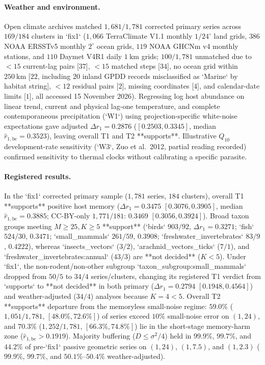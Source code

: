 \paragraph{Weather and environment.}
Open climate archives matched $1{,}681/1{,}781$ corrected primary series across $169/184$ clusters in `fix1` ($1{,}066$ TerraClimate V1.1 monthly $1/24^\circ$ land grids, $386$ NOAA ERSSTv5 monthly $2^\circ$ ocean grids, $119$ NOAA GHCNm v4 monthly stations, and $110$ Daymet V4R1 daily $1\ \mathrm{km}$ grids; $100/1{,}781$ unmatched due to $< 15$ current-lag pairs [$37$], $< 15$ matched steps [$34$], no ocean grid within $250\ \mathrm{km}$ [$22$, including $20$ inland GPDD records misclassified as `Marine` by habitat string], $< 12$ residual pairs [$2$], missing coordinates [$4$], and calendar-date limits [$1$], all accessed 15 November 2026). Regressing log host abundance on linear trend, current and physical lag-one temperature, and complete contemporaneous precipitation (`W1`) using projection-specific white-noise expectations gave adjusted $\Delta r_1 = 0.2876$ ($[0.2503, 0.3345]$, median $\hat{r}_{1,\mathrm{bc}} = 0.3523$), leaving overall T1 and T2 **supports**. Illustrative $Q_{10}$ development-rate sensitivity (`W3`, Zuo et al.\ 2012, partial reading recorded) confirmed sensitivity to thermal clocks without calibrating a specific parasite.

\paragraph{Registered results.}
In the `fix1` corrected primary sample ($1{,}781$ series, $184$ clusters), overall T1 **supports** positive host memory ($\Delta r_1 = 0.3475$ $[0.3076, 0.3905]$, median $\hat{r}_{1,\mathrm{bc}} = 0.3885$; CC-BY-only $1{,}771/181$: $0.3469$ $[0.3056, 0.3924]$). Broad taxon groups meeting $M \ge 25, K \ge 5$ **support** (`birds` $903/92$, $\Delta r_1 = 0.3271$; `fish` $524/30$, $0.3471$; `small\_mammals` $261/59$, $0.3908$; `freshwater\_invertebrates` $83/9$, $0.4222$), whereas `insects\_vectors` ($3/2$), `arachnid\_vectors\_ticks` ($7/1$), and `freshwater\_invertebrates:annual` ($43/3$) are **not decided** ($K < 5$). Under `fix1`, the non-rodent/non-other subgroup `taxon\_subgroup:small\_mammals` dropped from $50/5$ to $34/4$ series/clusters, changing its registered T1 verdict from `supports` to **not decided** in both primary ($\Delta r_1 = 0.2794$ $[0.1948, 0.4564]$) and weather-adjusted ($34/4$) analyses because $K = 4 < 5$. Overall T2 **supports** departure from the memoryless small-noise regime: $59.0\%$ ($1{,}051/1{,}781$, $[48.0\%, 72.6\%]$) of series exceed $10\%$ small-noise error on $(1, 24)$, and $70.3\%$ ($1{,}252/1{,}781$, $[66.3\%, 74.8\%]$) lie in the short-stage memory-harm zone ($\hat{r}_{1,\mathrm{bc}} > 0.1919$). Majority buffering ($D \le \sigma^2/4$) held in $99.9\%$, $99.7\%$, and $44.2\%$ of pre-`fix1` passive geometric series on $(1, 24)$, $(1, 7.5)$, and $(1, 2.3)$ ($99.9\%$, $99.7\%$, and $50.1\%$--$50.4\%$ weather-adjusted).

